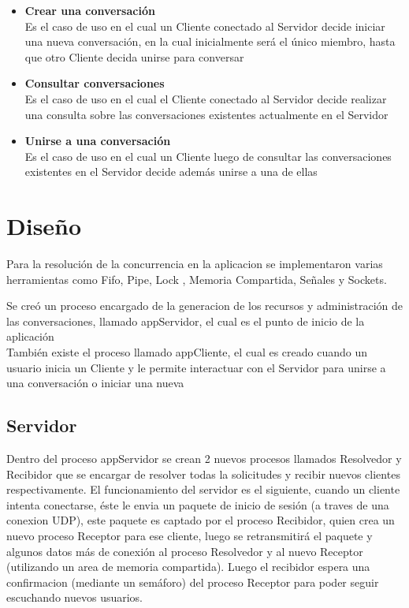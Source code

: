 \documentclass[a4paper,12pt,titlepage]{article}
\begin{document}
\begin{itemize}
\item \textbf{Crear una conversación}\\ 
  Es el caso de uso en el cual un Cliente conectado al Servidor decide iniciar una nueva conversación, en la cual inicialmente
  será el único miembro, hasta que otro Cliente decida unirse para conversar
\item \textbf{Consultar conversaciones}\\
  Es el caso de uso en el cual el Cliente conectado al Servidor decide realizar una consulta sobre las conversaciones
  existentes actualmente en el Servidor
\item \textbf{Unirse a una conversación}\\
  Es el caso de uso en el cual un Cliente luego de consultar las conversaciones existentes en el Servidor decide además
  unirse a una de ellas\\
\end{itemize} 


\newpage
\section{Diseño}

Para la resolución de la concurrencia en la aplicacion se implementaron varias herramientas como Fifo, Pipe, Lock , 
Memoria Compartida, Señales y Sockets.

Se creó un proceso encargado de la generacion de los recursos y administración de las conversaciones, llamado 
appServidor, el cual es el punto de inicio de la aplicación\\

También existe el proceso llamado appCliente, el cual es creado cuando un usuario inicia un Cliente y le permite interactuar con
el Servidor para unirse a una conversación o iniciar una nueva\\

\subsection{Servidor}
Dentro del proceso appServidor se crean 2 nuevos procesos llamados Resolvedor y Recibidor que se encargar de resolver todas la solicitudes 
y recibir nuevos clientes respectivamente.
El funcionamiento del servidor es el siguiente, cuando un cliente intenta conectarse, éste le envia un paquete de inicio de sesión (a traves 
de una conexion UDP), este paquete es captado por el proceso Recibidor, quien crea un nuevo proceso Receptor para ese cliente, luego 
se retransmitirá el paquete y algunos datos más de conexión al proceso Resolvedor y al nuevo Receptor (utilizando un area de memoria compartida). 
Luego el recibidor espera una confirmacion (mediante un semáforo) del proceso Receptor para poder seguir escuchando nuevos usuarios.\\
\end{document}
